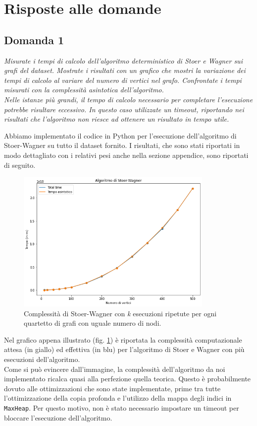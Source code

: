 \section{Risposte alle domande}

\subsection{Domanda 1}
\textit{Misurate i tempi di calcolo dell'algoritmo deterministico di Stoer e Wagner sui grafi del dataset. Mostrate i risultati con un grafico che mostri la variazione dei tempi di calcolo al variare del numero di vertici nel grafo. Confrontate i tempi misurati con la complessità asintotica dell'algoritmo. \\
Nelle istanze più grandi, il tempo di calcolo necessario per completare l'esecuzione potrebbe risultare eccessivo. In questo caso utilizzate un timeout, riportando nei risultati che l'algoritmo non riesce ad ottenere un risultato in tempo utile.}

Abbiamo implementato il codice in Python per l'esecuzione dell'algoritmo di Stoer-Wagner su tutto il dataset fornito. I risultati, che sono stati riportati in modo dettagliato con i relativi pesi anche nella sezione appendice, sono riportati di seguito.

\begin{figure}[H]
	\centering
	\includegraphics[width=0.85\textwidth]{res/images/single/stoerwagner}
	\caption{Complessità di Stoer-Wagner con \textit{k} esecuzioni ripetute per ogni quartetto di grafi con uguale numero di nodi.}
	\label{fig:stoerwagner}
\end{figure}

Nel grafico appena illustrato (fig. \ref{fig:stoerwagner}) è riportata la complessità computazionale attesa (in giallo) ed effettiva (in blu) per l'algoritmo di Stoer e Wagner con più esecuzioni dell'algoritmo. \\
Come si può evincere dall'immagine, la complessità dell'algoritmo da noi implementato ricalca quasi alla perfezione quella teorica. Questo è probabilmente dovuto alle ottimizzazioni che sono state implementate, prime tra tutte l'ottimizzazione della copia profonda e l'utilizzo della mappa degli indici in \texttt{MaxHeap}. Per questo motivo, non è stato necessario impostare un timeout per bloccare l'esecuzione dell'algoritmo.

